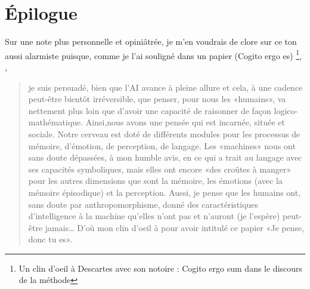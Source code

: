 \section{Épilogue}

Sur une note plus personnelle et opiniâtrée, je m'en voudrais de clore sur ce ton aussi alarmiste puisque, comme je l'ai souligné dans un papier (Cogito ergo es) \footnote{Un clin d'oeil à Descartes avec son notoire : Cogito ergo sum dans le discours de la méthode}, \citep{loyer2024cogito},
    \begin{quote}
        je suis persuadé, bien que l'AI avance à pleine allure et cela, à une cadence peut-être bientôt irréversible, que penser, pour nous les «humains», va nettement plus loin que d'avoir une capacité de raisonner de façon logico-mathématique. Ainsi,nous avons une pensée qui est incarnée, située et sociale. Notre cerveau est doté de différents modules pour les processus de mémoire, d'émotion, de perception, de langage. Les «machines» nous ont sans doute dépassées, à mon humble avis, en ce qui a trait au langage avec ses capacités symboliques, mais elles ont encore «des croûtes à manger» pour les autres dimensions que sont la mémoire, les émotions (avec la mémoire épisodique) et la perception. Aussi, je pense que les humains ont, sans doute par anthropomorphisme, donné des caractéristiques d'intelligence à la machine qu'elles n'ont pas et n'auront (je l'espère) peut-être jamais… D'où mon clin d'oeil à \citep{descartes1637discours} pour avoir intitulé ce papier «Je pense, donc tu es».
    \end{quote}

